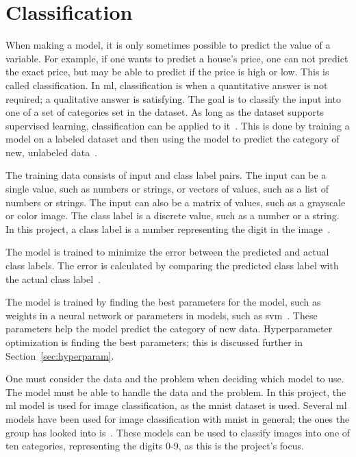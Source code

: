 \section{Classification}\label{sec:classification}
When making a model, it is only sometimes possible to predict the value of a variable. For example, if one wants to predict a house's price, one can not predict the exact price, but may be able to predict if the price is high or low. This is called classification. In \gls{ml}, classification is when a quantitative answer is not required; a qualitative answer is satisfying. The goal is to classify the input into one of a set of categories set in the dataset. As long as the dataset supports supervised learning, classification can be applied to it~\cite{james-statistical-learning1}.
This is done by training a model on a labeled dataset and then using the model to predict the category of new, unlabeled data~\cite{james-statistical-learning1}.

The training data consists of input and class label pairs. The input can be a single value, such as numbers or strings, or vectors of values, such as a list of numbers or strings. The input can also be a matrix of values, such as a grayscale or color image. The class label is a discrete value, such as a number or a string. In this project, a class label is a number representing the digit in the image~\cite{james-statistical-learning1}.

The model is trained to minimize the error between the predicted and actual class labels. The error is calculated by comparing the predicted class label with the actual class label~\cite{james-statistical-learning1}.

The model is trained by finding the best parameters for the model, such as weights in a neural network or parameters in models, such as \gls{svm}~\cite{james-statistical-learning1}. These parameters help the model predict the category of new data. Hyperparameter optimization is finding the best parameters; this is discussed further in Section~\ref{sec:hyperparam}.

One must consider the data and the problem when deciding which model to use. The model must be able to handle the data and the problem. In this project, the \gls{ml} model is used for image classification, as the \gls{mnist} dataset is used. Several \gls{ml} models have been used for image classification with \gls{mnist} in general; the ones the group has looked into is~\cite{lecun-mnist-database,IBM-computer-vision,convolutional-neural-networks-convnets,multi-column-neural-network-ciregan}. These models can be used to classify images into one of ten categories, representing the digits 0-9, as this is the project's focus.

